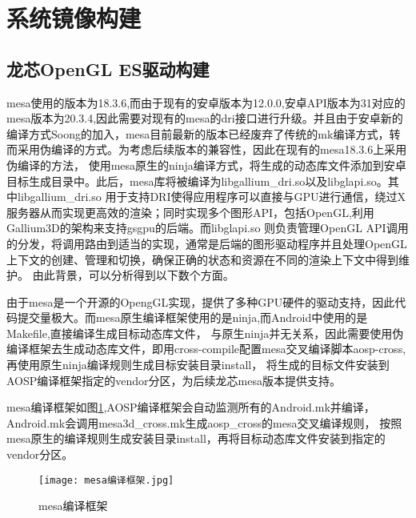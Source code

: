 



\section{系统镜像构建}

\subsection{龙芯OpenGL ES驱动构建}

mesa使用的版本为18.3.6,而由于现有的安卓版本为12.0.0,安卓API版本为31对应的mesa版本为20.3.4,因此需要对现有的mesa的dri接口进行升级。并且由于安卓新的
编译方式Soong的加入，mesa目前最新的版本已经废弃了传统的mk编译方式，转而采用伪编译的方式。为考虑后续版本的兼容性，因此在现有的mesa18.3.6上采用伪编译的方法，
使用mesa原生的ninja编译方式，将生成的动态库文件添加到安卓目标生成目录中。此后，mesa库将被编译为libgallium\_dri.so以及libglapi.so。其中libgallium\_dri.so
用于支持DRI使得应用程序可以直接与GPU进行通信，绕过X服务器从而实现更高效的渲染；同时实现多个图形API，包括OpenGL,利用Gallium3D的架构来支持gsgpu的后端。而libglapi.so
则负责管理OpenGL API调用的分发，将调用路由到适当的实现，通常是后端的图形驱动程序并且处理OpenGL上下文的创建、管理和切换，确保正确的状态和资源在不同的渲染上下文中得到维护。
由此背景，可以分析得到以下数个方面。

由于mesa是一个开源的OpengGL实现，提供了多种GPU硬件的驱动支持，因此代码提交量极大。而mesa原生编译框架使用的是ninja,而Android中使用的是Makefile,直接编译生成目标动态库文件，
与原生ninja并无关系，因此需要使用伪编译框架去生成动态库文件，即用cross-compile配置mesa交叉编译脚本aosp-cross,再使用原生ninja编译规则生成目标安装目录install，
将生成的目标文件安装到AOSP编译框架指定的vendor分区，为后续龙芯mesa版本提供支持。

mesa编译框架如图\ref{fig:mesa编译框架},AOSP编译框架会自动监测所有的Android.mk并编译，Android.mk会调用mesa3d\_cross.mk生成aosp\_cross的mesa交叉编译规则，
按照mesa原生的编译规则生成安装目录install，再将目标动态库文件安装到指定的vendor分区。
\begin{figure}[h]
  \centering
  \texttt{[image: mesa编译框架.jpg]}
  \caption{mesa编译框架}
  \label{fig:mesa编译框架}
\end{figure}

